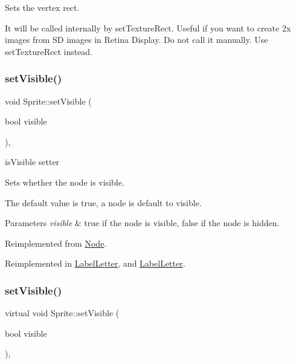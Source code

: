 Sets the vertex rect.

It will be called internally by set\+Texture\+Rect. Useful if you want to create 2x images from SD images in Retina Display. Do not call it manually. Use set\+Texture\+Rect instead. \mbox{\label{classSprite_abdaaa50259a13af3d6e8effded4ba42b}} 
\subsubsection{\texorpdfstring{set\+Visible()}{setVisible()}\hspace{0.1cm}{\footnotesize\ttfamily [1/2]}}
{\footnotesize\ttfamily void Sprite\+::set\+Visible (\begin{DoxyParamCaption}\item[{bool}]{visible }\end{DoxyParamCaption})\hspace{0.3cm}{\ttfamily [override]}, {\ttfamily [virtual]}}



is\+Visible setter 

Sets whether the node is visible.

The default value is true, a node is default to visible.


\begin{DoxyParams}{Parameters}
{\em visible} & true if the node is visible, false if the node is hidden. \\
\hline
\end{DoxyParams}


Reimplemented from \hyperlink{classNode_ad8d9f6f838941a2a8ae18420757af158}{Node}.



Reimplemented in \hyperlink{classLabelLetter_aa46db980ecd91de0f00c7aee1f2f52f9}{Label\+Letter}, and \hyperlink{classLabelLetter_aa46db980ecd91de0f00c7aee1f2f52f9}{Label\+Letter}.

\mbox{\label{classSprite_a5bf8d98b0feb78acf0bbf4b3b3fa6d59}} 
\subsubsection{\texorpdfstring{set\+Visible()}{setVisible()}\hspace{0.1cm}{\footnotesize\ttfamily [2/2]}}
{\footnotesize\ttfamily virtual void Sprite\+::set\+Visible (\begin{DoxyParamCaption}\item[{bool}]{visible }\end{DoxyParamCaption})\hspace{0.3cm}{\ttfamily [override]}, {\ttfamily [virtual]}}




